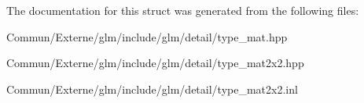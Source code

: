 The documentation for this struct was generated from the following files\+:\begin{DoxyCompactItemize}
\item 
Commun/\+Externe/glm/include/glm/detail/type\+\_\+mat.\+hpp\item 
Commun/\+Externe/glm/include/glm/detail/type\+\_\+mat2x2.\+hpp\item 
Commun/\+Externe/glm/include/glm/detail/type\+\_\+mat2x2.\+inl\end{DoxyCompactItemize}
